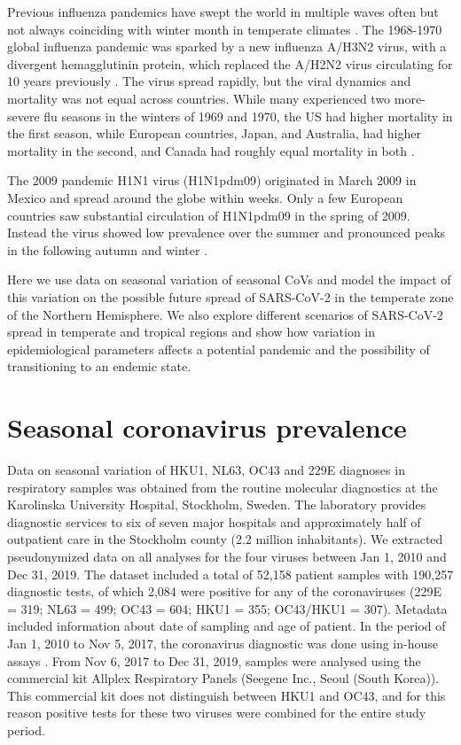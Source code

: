 \documentclass[rmp, reprint, superscriptaddress, floatfix,amsmath]{revtex4-1}
\begin{document}
Previous influenza pandemics have swept the world in multiple waves often but not always coinciding with winter month in temperate climates \citep{taubenberger_1918_2019,viboud_multinational_2005,viboud_global_2016,amato-gauci_surveillance_2011}. 
The 1968-1970 global influenza pandemic was sparked by a new influenza A/H3N2 virus, with a divergent hemagglutinin protein, which replaced the A/H2N2 virus circulating for 10 years previously \citep{viboud_multinational_2005}. The virus spread rapidly, but the viral dynamics and mortality was not equal across countries. While many experienced two more-severe flu seasons in the winters of 1969 and 1970, the US had higher mortality in the first season, while European countries, Japan, and Australia, had higher mortality in the second, and Canada had roughly equal mortality in both \citep{viboud_multinational_2005}.

The 2009 pandemic H1N1 virus (H1N1pdm09) originated in March 2009 in Mexico and spread around the globe within weeks.
Only a few European countries saw substantial circulation of H1N1pdm09 in the spring of 2009. Instead the virus showed low prevalence over the summer and pronounced peaks in the following autumn and winter \citep{amato-gauci_surveillance_2011}.

Here we use data on seasonal variation of seasonal CoVs and model the impact of this variation on the possible future spread of SARS-CoV-2 in the temperate zone of the Northern Hemisphere. 
We also explore different scenarios of SARS-CoV-2 spread in temperate and tropical regions and show how variation in epidemiological parameters affects a potential pandemic and the possibility of transitioning to an endemic state. 

\section{Seasonal coronavirus prevalence} 

Data on seasonal variation of HKU1, NL63, OC43 and 229E diagnoses in respiratory samples was obtained from the routine molecular diagnostics at the Karolinska University Hospital, Stockholm, Sweden. The laboratory provides diagnostic services to six of seven major hospitals and approximately half of outpatient care in the Stockholm county (2.2 million inhabitants). We extracted pseudonymized data on all analyses for the four viruses between Jan 1, 2010 and Dec 31, 2019. The dataset included a total of 52,158 patient samples with 190,257 diagnostic tests, of which 2,084 were positive for any of the coronaviruses (229E = 319; NL63 = 499; OC43 = 604; HKU1 = 355; OC43/HKU1 = 307). Metadata included information about date of sampling and age of patient. 
In the period of Jan 1, 2010 to Nov 5, 2017, the coronavirus diagnostic was done using in-house assays \citep{tiveljung2009development}. From Nov 6, 2017 to Dec 31, 2019, samples were analysed using the commercial kit Allplex Respiratory Panels (Seegene Inc., Seoul (South Korea)). This commercial kit does not distinguish between HKU1 and OC43, and for this reason positive tests for these two viruses were combined for the entire study period. 
\end{document}
